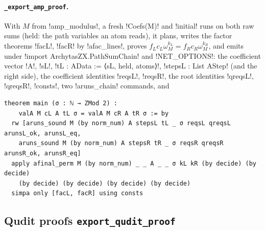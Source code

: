 {{{\paragraph{\texttt{\_export\_amp\_proof}.} With $M$ from \lexpy!amp_modulus!, a fresh
\lexpy!Coefs(M)! and \lexpy!initial! runs on both raw sums (held: the path variables an atom reads),
it plans, writes the factor theorems \lexlean!facL!, \lexlean!facR! by \lexpy!afac_lines!, proves
$f_L c_L\omega_M^{k_L} = f_R c_R\omega_M^{k_R}$, and emits under
\lexlean!import ArchytasZX.PathSumChain! and \lexpy!NET_OPTIONS!: the coefficient vector \lexlean!A!,
\lexlean!sL!, \lexlean!tL : AData := ⟨sL, held, atoms⟩!, \lexlean!stepsL : List AStep! (and the right
side), the coefficient identities \lexlean!reqsL!, \lexlean!reqsR!, the root identities
\lexlean!qreqsL!, \lexlean!qreqsR!, \lexlean!consts!, two \lexlean!aruns_chain! commands, and
\begin{lstlisting}[style=lexlean]
theorem main (σ : ℕ → ZMod 2) :
    valA M cL A tL σ = valA M cR A tR σ := by
  rw [aruns_sound M (by norm_num) A stepsL tL _ σ reqsL qreqsL arunsL_ok, arunsL_eq,
    aruns_sound M (by norm_num) A stepsR tR _ σ reqsR qreqsR arunsR_ok, arunsR_eq]
  apply afinal_perm M (by norm_num) _ _ A _ _ σ kL kR (by decide) (by decide)
    (by decide) (by decide) (by decide) (by decide)
  simpa only [facL, facR] using consts
\end{lstlisting}

\subsection{Qudit proofs \texttt{export\_qudit\_proof}}

}}}
